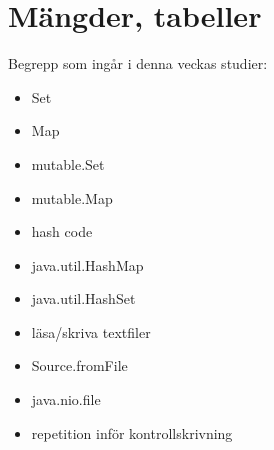 \chapter{Mängder, tabeller}\label{chapter:W07}
Begrepp som ingår i denna veckas studier:
\begin{itemize}[noitemsep,label={$\square$},leftmargin=*]
\item Set
\item Map
\item mutable.Set
\item mutable.Map
\item hash code
\item java.util.HashMap
\item java.util.HashSet
\item läsa/skriva textfiler
\item Source.fromFile
\item java.nio.file
\item repetition inför kontrollskrivning\end{itemize}
